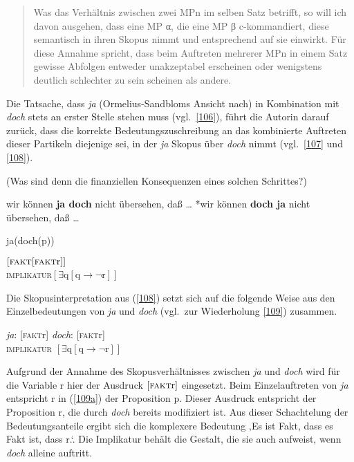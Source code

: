 \begin{quotation}
Was das Verhältnis zwischen zwei MPn im selben Satz betrifft, so will ich davon ausgehen, dass eine MP α, die eine MP β  c-kommandiert, diese semantisch in ihren Skopus nimmt und entsprechend auf sie einwirkt. Für diese Annahme spricht, dass beim Auftreten mehrerer MPn in einem Satz gewisse Abfolgen entweder unakzeptabel erscheinen oder wenigstens deutlich schlechter zu sein scheinen als andere.
\end{quotation}
Die Tatsache, dass \textit{ja} (Ormelius-Sandbloms Ansicht nach) in Kombination mit \textit{doch} stets an erster Stelle stehen muss (vgl.\ \ref{106}), führt die Autorin darauf zurück, dass die korrekte Bedeutungszuschreibung an das kombinierte Auftreten dieser Partikeln diejenige sei, in der \textit{ja} Skopus über \textit{doch} nimmt (vgl.\ \ref{107} und \ref{108}).

\begin{exe}
	\ex\label{106}
	(Was sind denn die finanziellen Konsequenzen eines solchen Schrittes?) 
		\begin{xlist}	
			\ex\label{106a} wir können \textbf{ja doch} nicht übersehen, daß \ldots                                  
			\ex\label{106b} *wir können \textbf{doch ja} nicht übersehen, daß \ldots
		\end{xlist}
\end{exe}

\begin{exe}
	\ex\label{107}														 
	ja(doch(p))
\end{exe}

\begin{exe}
	\ex\label{108}														 
	$[\textrm{\textsc{fakt}[\textsc{fakt}r]]}$\\
	\textsc{implikatur}$ [\exists \textrm{q} [\textrm{q} → \neg \textrm{r}]]$
	\hfill\hbox{\citet[93]{Ormelius-Sandblom1997}}
\end{exe}
Die Skopusinterpretation aus (\ref{108}) setzt sich auf die folgende Weise aus den Einzelbedeutungen von \textit{ja} und \textit{doch} (vgl.\ zur Wiederholung \ref{109}) zusammen.

\begin{exe}
	\ex\label{109} 
		\begin{xlist}	
			\ex\label{109a} \textit{ja}: [\textsc{fakt}r]
			\ex\label{109b}  \textit{doch}: [\textsc{fakt}r] \\
							\textsc{implikatur} $[\exists \textrm{q} [\textrm{q} → \neg \textrm{r}]]$			
		\end{xlist}
\end{exe}
Aufgrund der Annahme des Skopusverhältnisses zwischen \textit{ja }und \textit{doch} wird für die Variable r hier der Ausdruck $\textrm{[\textsc{fakt}r]}$ eingesetzt. Beim Einzelauftreten von \textit{ja} entspricht r in (\ref{109a}) der Proposition p. Dieser Ausdruck entspricht der Proposition r, die durch \textit{doch} bereits modifiziert ist. Aus dieser Schachtelung der Bedeutungsanteile ergibt sich die komplexere Bedeutung ‚Es ist Fakt, dass es Fakt ist, dass r.‘. Die Implikatur behält die Gestalt, die sie auch aufweist, wenn \textit{doch} alleine auftritt.
 
